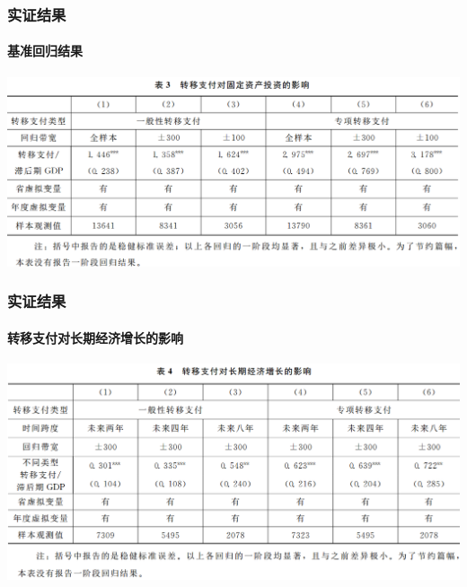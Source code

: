 \begin{frame}[t]
	\frametitle{实证结果}
	\framesubtitle{基准回归结果}
	\begin{center}
		\includegraphics[width=\textwidth]{image/b3.png}
	\end{center}
	
\end{frame}

\begin{frame}[t]
	\frametitle{实证结果}
	\framesubtitle{转移支付对长期经济增长的影响}
	\begin{center}
		\includegraphics[width=\textwidth]{image/b4.png}
	\end{center}
	
\end{frame}

